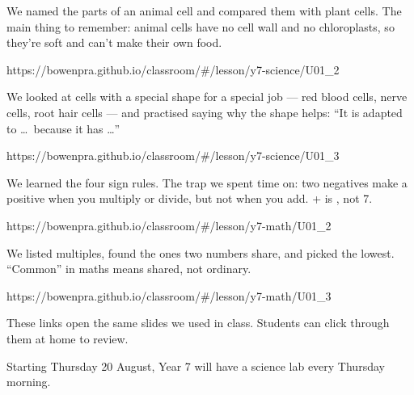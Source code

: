 \documentclass[11pt]{article}
\begin{document}

\begin{annbody}


We named the parts of an animal cell and compared them with plant cells. The
main thing to remember: animal cells have no cell wall and no chloroplasts, so
they're soft and can't make their own food.\par
\vspace{3pt}%
  {https://bowenpra.github.io/classroom/\#/lesson/y7-science/U01\_2}

We looked at cells with a special shape for a special job --- red blood cells,
nerve cells, root hair cells --- and practised saying why the shape helps:
``It is adapted to \ldots\ because it has \ldots''\par
\vspace{3pt}%
  {https://bowenpra.github.io/classroom/\#/lesson/y7-science/U01\_3}

We learned the four sign rules. The trap we spent time on: two negatives make a
positive when you multiply or divide, but not when you add.  +
 is , not 7.\par
\vspace{3pt}%
  {https://bowenpra.github.io/classroom/\#/lesson/y7-math/U01\_2}

We listed multiples, found the ones two numbers share, and picked the lowest.
``Common'' in maths means shared, not ordinary.\par
\vspace{3pt}%
  {https://bowenpra.github.io/classroom/\#/lesson/y7-math/U01\_3}

\vspace{5pt}
These links open the same slides we used in class. Students can click through
them at home to review.


Starting Thursday 20 August, Year 7 will have a science lab every Thursday
morning.


\end{annbody}
\end{document}
